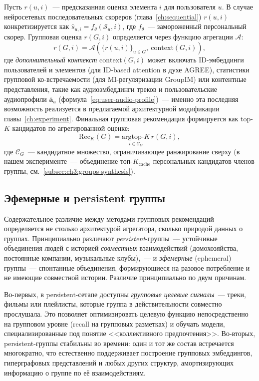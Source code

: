 Пусть $r(u, i)$~--- предсказанная оценка элемента $i$ для пользователя $u$. В случае нейросетевых последовательных скореров (глава~\ref{ch:sequential}) $r(u, i)$ конкретизируется как $\hat{s}_{u, i} = f_\theta(\mathcal{S}_u, i)$, где $f_\theta$~--- замороженный персональный скорер. Групповая оценка $r(G, i)$ определяется через функцию агрегации $\mathcal{A}$:
\begin{equation*}
    r(G, i) = \mathcal{A}\!\left( \{ r(u, i) \}_{u \in G},\ \mathrm{context}(G, i) \right),
\end{equation*}
где \emph{дополнительный контекст} $\mathrm{context}(G, i)$ может включать ID-эмбеддинги пользователей и элементов (для ID-based attention в духе AGREE), статистики групповой ко-встречаемости (для MI-регуляризации GroupIM) или контентные представления, такие как аудиоэмбеддинги треков и пользовательские аудиопрофили $\bar{\mathbf{a}}_u$ (формула~\eqref{eq:user-audio-profile})~--- именно эта последняя возможность реализуется в предлагаемой архитектурной модификации главы~\ref{ch:experiment}. Финальная групповая рекомендация формируется как top-$K$ кандидатов по агрегированной оценке:
\begin{equation*}
    \mathrm{Rec}_K(G) = \underset{i \in \mathcal{C}_G}{\mathrm{argtop}\text{-}K}\, r(G, i),
\end{equation*}
где $\mathcal{C}_G$~--- кандидатное множество, ограничивающее ранжирование сверху (в нашем эксперименте~--- объединение топ-$K_{\mathrm{cache}}$ персональных кандидатов членов группы, см.~\ref{subsec:ch3:groups-synthesis}).

\subsection{Эфемерные и persistent группы}
\label{subsec:ch2:ephemeral}

Содержательное различие между методами групповых рекомендаций определяется не столько архитектурой агрегатора, сколько природой данных о группах. Принципиально различают \emph{persistent}-группы~--- устойчивые объединения людей с историей \emph{совместных} взаимодействий (домохозяйства, постоянные компании, музыкальные клубы),~--- и \emph{эфемерные} (ephemeral) группы~--- спонтанные объединения, формирующиеся на разовое потребление и не имеющие совместной истории. Различие принципиально по двум причинам.

Во-первых, в persistent-сетапе доступны \emph{групповые целевые сигналы}~--- треки, фильмы или плейлисты, которые группа в действительности совместно прослушала. Это позволяет оптимизировать целевую функцию непосредственно на групповом уровне (recall на групповых разметках) и обучать модели, специализированные под понятие <<коллективного предпочтения>>. Во-вторых, persistent-группы стабильны во времени: один и тот же состав встречается многократно, что естественно поддерживает построение групповых эмбеддингов, гиперграфовых представлений и любых других структур, амортизирующих информацию о группе по её взаимодействиям.


